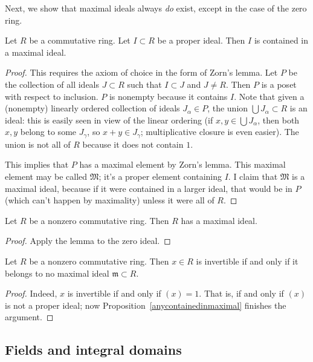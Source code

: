 Next, we show that maximal ideals always \emph{do} exist, except in the case
of the zero ring. 
\begin{proposition} \label{anycontainedinmaximal}
Let $R$ be a commutative ring. Let $I \subset R$ be a proper ideal.  Then $I$
is contained in a maximal ideal.
\end{proposition} 

\begin{proof} 
This requires the axiom of choice in the form of Zorn's lemma.  Let
$P$ be the collection of all ideals $J \subset R$ such that $I
\subset J$ and $J \neq R$.  Then $P$ is a poset with respect to  inclusion.  $P$ is
nonempty because it contains $I$.  Note that given a (nonempty) linearly ordered
collection of ideals $J_{\alpha} \in P$, the union $\bigcup J_{\alpha} \subset
R$ is an ideal: this is easily seen in view of the linear ordering (if $x,y
\in \bigcup J_{\alpha}$, then both $x,y$ belong to some $J_{\gamma}$, so $x+y
\in J_{\gamma}$; multiplicative closure is even easier). The union is not all
of $R$ because it does not contain $1$.  

This implies that $P$ has a maximal element by Zorn's lemma.  This maximal element may
be called $\mathfrak{M}$; it's a proper element containing $I$. I claim that
$\mathfrak{M}$ is a maximal ideal, because if it were contained in a larger
 ideal, that would  be in $P$ (which can't happen by maximality) unless it were all of $R$.
\end{proof} 

\begin{corollary} 
Let $R $ be a nonzero commutative ring.  Then $R$ has a maximal ideal.
\end{corollary} 
\begin{proof} 
Apply the lemma to the zero ideal.  
\end{proof} 

\begin{corollary} 
Let $R$ be a nonzero commutative ring. Then $x \in R$ is invertible if and
only if it belongs to no maximal ideal $\mathfrak{m} \subset R$.
\end{corollary} 
\begin{proof} 
Indeed, $x$ is invertible if and only if $(x) = 1$. That is, if and only if
$(x)$ is not a proper ideal; now Proposition~\ref{anycontainedinmaximal}
finishes the argument.
\end{proof} 

\subsection{Fields and integral domains}

